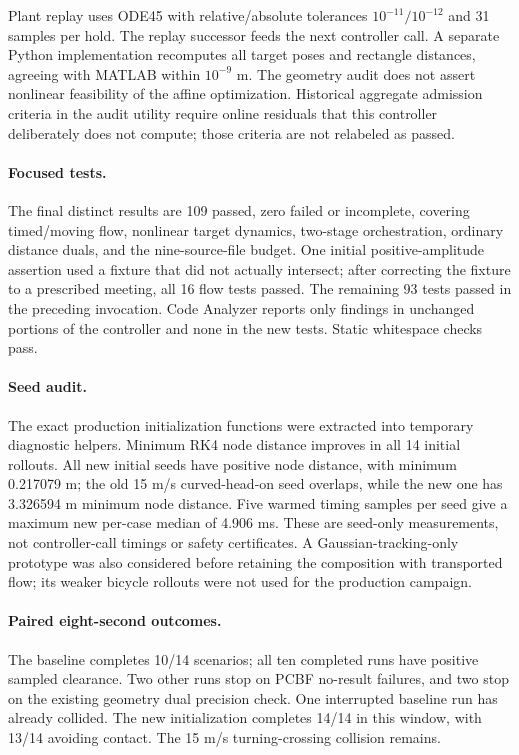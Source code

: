 \documentclass[11pt]{article}
\begin{document}
Plant replay uses ODE45 with relative/absolute tolerances $10^{-11}/10^{-12}$
and 31 samples per hold. The replay successor feeds the next controller call.
A separate Python implementation recomputes all target poses and rectangle
distances, agreeing with MATLAB within $10^{-9}$ m. The geometry audit does not
assert nonlinear feasibility of the affine optimization. Historical aggregate
admission criteria in the audit utility require online residuals that this
controller deliberately does not compute; those criteria are not relabeled
as passed.

\paragraph{Focused tests.} The final distinct results are 109 passed, zero
failed or incomplete, covering timed/moving flow, nonlinear target dynamics,
two-stage orchestration, ordinary distance duals, and the nine-source-file
budget. One initial positive-amplitude assertion used a fixture that did not
actually intersect; after correcting the fixture to a prescribed meeting,
all 16 flow tests passed. The remaining 93 tests passed in the preceding
invocation. Code Analyzer reports only findings in unchanged portions of the
controller and none in the new tests. Static whitespace checks pass.

\paragraph{Seed audit.} The exact production initialization functions were
extracted into temporary diagnostic helpers. Minimum RK4 node distance improves
in all 14 initial rollouts. All new initial seeds have positive node distance,
with minimum 0.217079 m; the old 15 m/s curved-head-on seed overlaps, while
the new one has 3.326594 m minimum node distance. Five warmed timing samples
per seed give a maximum new per-case median of 4.906 ms. These are seed-only
measurements, not controller-call timings or safety certificates. A
Gaussian-tracking-only prototype was also considered before retaining the
composition with transported flow; its weaker bicycle rollouts were not used
for the production campaign.

\paragraph{Paired eight-second outcomes.} The baseline completes 10/14
scenarios; all ten completed runs have positive sampled clearance. Two other
runs stop on PCBF no-result failures, and two stop on the existing geometry
dual precision check. One interrupted baseline run has already collided.
The new initialization completes 14/14 in this window, with 13/14 avoiding
contact. The 15 m/s turning-crossing collision remains.
\end{document}
